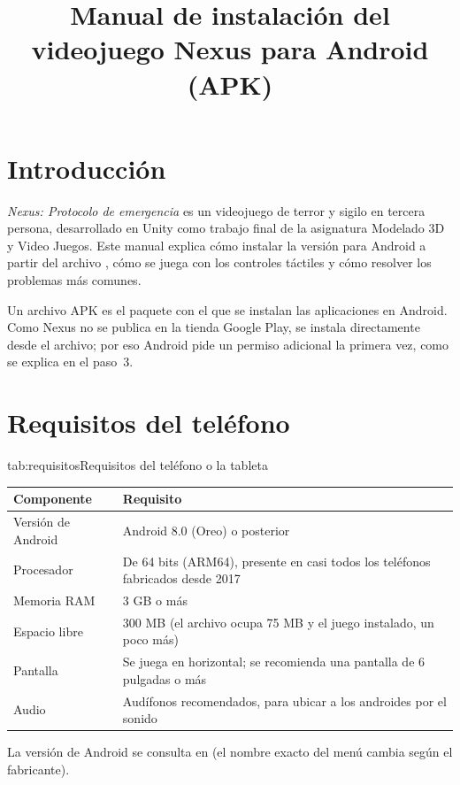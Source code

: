 \documentclass[stu,letterpaper,12pt,donotrepeattitle,floatsintext]{apa7}
\title{Manual de instalación del videojuego Nexus para Android (APK)}
\begin{document}
\maketitle

\section{Introducción}

\textit{Nexus: Protocolo de emergencia} es un videojuego de terror y sigilo en tercera persona,
desarrollado en Unity \parencite{unity2026} como trabajo final de la asignatura Modelado 3D y Video
Juegos. Este manual explica cómo instalar la versión para Android a partir del archivo
, cómo se juega con los controles táctiles y cómo resolver los problemas más
comunes.

Un archivo APK es el paquete con el que se instalan las aplicaciones en Android. Como Nexus no se
publica en la tienda Google Play, se instala directamente desde el archivo; por eso Android pide un
permiso adicional la primera vez, como se explica en el paso~3.

\section{Requisitos del teléfono}

\begin{TablaAPA}{tab:requisitos}{Requisitos del teléfono o la tableta}
\begin{tabularx}{\linewidth}{P{4cm}L}
\toprule
Componente & Requisito \\
\midrule
Versión de Android & Android 8.0 (Oreo) o posterior \\
Procesador & De 64 bits (ARM64), presente en casi todos los teléfonos fabricados desde 2017 \\
Memoria RAM & 3 GB o más \\
Espacio libre & 300 MB (el archivo ocupa 75 MB y el juego instalado, un poco más) \\
Pantalla & Se juega en horizontal; se recomienda una pantalla de 6 pulgadas o más \\
Audio & Audífonos recomendados, para ubicar a los androides por el sonido \\
\bottomrule
\end{tabularx}
\end{TablaAPA}

La versión de Android se consulta en  \textrightarrow{} 
\textrightarrow{}  (el nombre exacto del menú cambia según el
fabricante).
\end{document}
